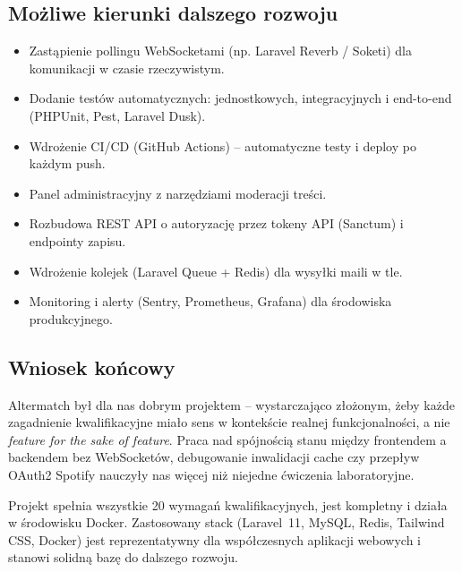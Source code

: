 \documentclass[12pt,a4paper]{article}
\begin{document}
\subsection{Możliwe kierunki dalszego rozwoju}

\begin{itemize}
    \item Zastąpienie pollingu WebSocketami (np. Laravel Reverb / Soketi) dla komunikacji w czasie rzeczywistym.
    \item Dodanie testów automatycznych: jednostkowych, integracyjnych i end-to-end (PHPUnit, Pest, Laravel Dusk).
    \item Wdrożenie CI/CD (GitHub Actions) -- automatyczne testy i deploy po każdym push.
    \item Panel administracyjny z narzędziami moderacji treści.
    \item Rozbudowa REST API o autoryzację przez tokeny API (Sanctum) i endpointy zapisu.
    \item Wdrożenie kolejek (Laravel Queue + Redis) dla wysyłki maili w tle.
    \item Monitoring i alerty (Sentry, Prometheus, Grafana) dla środowiska produkcyjnego.
\end{itemize}

\subsection{Wniosek końcowy}

Altermatch był dla nas dobrym projektem -- wystarczająco złożonym, żeby każde zagadnienie kwalifikacyjne miało sens w kontekście realnej funkcjonalności, a nie \textit{feature for the sake of feature}. Praca nad spójnością stanu między frontendem a backendem bez WebSocketów, debugowanie inwalidacji cache czy przepływ OAuth2 Spotify nauczyły nas więcej niż niejedne ćwiczenia laboratoryjne.

Projekt spełnia wszystkie 20 wymagań kwalifikacyjnych, jest kompletny i działa w środowisku Docker. Zastosowany stack (Laravel~11, MySQL, Redis, Tailwind CSS, Docker) jest reprezentatywny dla współczesnych aplikacji webowych i stanowi solidną bazę do dalszego rozwoju.
\end{document}
